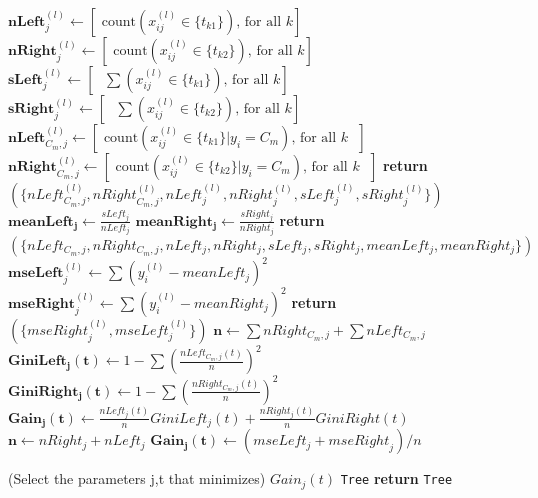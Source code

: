 \documentclass[10]{article}
\begin{document}
\begin{algorithm}
\begin{algorithmic}[1]
						\State $\mathbf{nLeft}_{j}^{(l)} \gets  [ \text{ count}{(x_{ij}^{(l)} \in \{t_{k1}\})} \text{, for all } k ]$
						\State $\mathbf{nRight}_{j}^{(l)} \gets [ \text{ count}{(x_{ij}^{(l)} \in \{t_{k2}\})} \text{, for all } k ]$
						\State $\mathbf{sLeft}_{j}^{(l)} \gets  [ \text{ }\sum{(x_{ij}^{(l)} \in \{t_{k1}\})} \text{, for all } k ]$
						\State $\mathbf{sRight}_{j}^{(l)} \gets [ \text{ }\sum{(x_{ij}^{(l)} \in \{t_{k2}\})} \text{, for all } k ]$
					\EndIf
						\State $\mathbf{nLeft}_{C_m,j}^{(l)} \gets  [ \text{ count}{(x^{(l)}_{ij} \in \{t_{k1}\}  | y_i =C_m)} \text{, for all } k \text{ }]$
						\State $\mathbf{nRight}_{C_m,j}^{(l)} \gets [ \text{ count}{(x^{(l)}_{ij} \in \{t_{k2}\}  | y_i =C_m)} \text{, for all } k \text{ }]$
					\EndIf
				\EndFor
			    \State \textbf{return} $(\{{nLeft}_{C_m,j}^{(l)},{nRight}_{C_m,j}^{(l)},{nLeft}_{j}^{(l)},{nRight}_{j}^{(l)},{sLeft}_{j}^{(l)},{sRight}_{j}^{(l)}\})$
			\EndProcedure
\State {}
				\State {}
					\State $\mathbf{meanLeft_j} \gets \frac{sLeft_j}{nLeft_j}$
					\State $\mathbf{meanRight_j} \gets \frac{sRight_j}{nRight_j}$
				\EndIf
				\State \textbf{return} $(\{nLeft_{C_m,j},nRight_{C_m,j},nLeft_j,nRight_j,sLeft_j,sRight_j,meanLeft_j, meanRight_j\})$
			\EndProcedure
\State {}
		 
				\State $\mathbf{mseLeft}_{j}^{(l)} \gets \sum ({{y}_{i}^{(l)} - meanLeft_j})^2$
				\State $\mathbf{mseRight}_{j}^{(l)} \gets \sum( {{y}_{i}^{(l)} - meanRight_j})^2$
			\EndIf
			\State \textbf{return} $(\{{mseRight}_{j}^{(l)},{mseLeft}_{j}^{(l)}\})$
		\EndProcedure
\State {}
			\State {}
				\State $\mathbf{n} \gets \sum{nRight_{C_m,j}} + \sum{nLeft_{C_m,j}}$
				\State $\mathbf{GiniLeft_j(t)} \gets 1 - \sum{(\frac{nLeft_{C_m,j}(t)}{n})^2}$
				\State $\mathbf{GiniRight_j(t)} \gets 1 - \sum{(\frac{nRight_{C_m,j}(t)}{n})}^2$
				\State $\mathbf{Gain_{j}(t)} \gets \frac{nLeft_j(t)}{n} GiniLeft_j(t) + \frac{nRight_j(t)}{n} GiniRight(t) $
			\EndIf
				\State $\mathbf{n} \gets nRight_{j}+nLeft_{j}$
				\State $\mathbf{Gain_{j}(t)} \gets ({mseLeft}_{j}+{mseRight}_{j})/ n$
			\EndIf

			\State \text(Select the parameters j,t that minimizes) $Gain_j(t)$
			\State {} \texttt{Tree}
			\State \textbf{return} \texttt{Tree}
		\EndProcedure
\State {}







		\EndLoop
   \end{algorithmic}
\end{algorithm}
\end{document}
